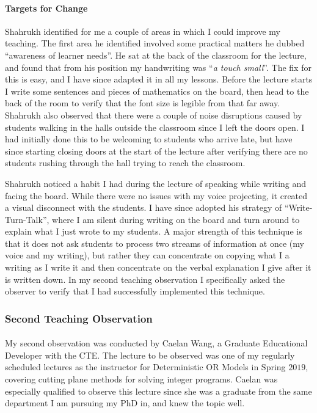 \documentclass{article}
\begin{document}
\paragraph{Targets for Change} Shahrukh identified for me a couple of areas in which I could improve my teaching. The first area he identified involved some practical matters he dubbed ``awareness of learner needs''. He sat at the back of the classroom for the lecture, and found that from his position my handwriting was ``\emph{a touch small}''. The fix for this is easy, and I have since adapted it in all my lessons. Before the lecture starts I write some sentences and pieces of mathematics on the board, then head to the back of the room to verify that the font size is legible from that far away. Shahrukh also observed that there were a couple of noise disruptions caused by students walking in the halls outside the classroom since I left the doors open. I had initially done this to be welcoming to students who arrive late, but have since starting closing doors at the start of the lecture after verifying there are no students rushing through the hall trying to reach the classroom.

Shahrukh noticed a habit I had during the lecture of speaking while writing and facing the board. While there were no issues with my voice projecting, it created a visual disconnect with the students. I have since adopted his strategy of ``Write-Turn-Talk'', where I am silent during writing on the board and turn around to explain what I just wrote to my students. A major strength of this technique is that it does not ask students to process two streams of information at once (my voice and my writing), but rather they can concentrate on copying what I a writing as I write it and then concentrate on the verbal explanation I give after it is written down. In my second teaching observation I specifically asked the observer to verify that I had successfully implemented this technique.

\subsubsection*{Second Teaching Observation}
\paragraph{}My second observation was conducted by Caelan Wang, a Graduate Educational Developer with the CTE. The lecture to be observed was one of my regularly scheduled lectures as the instructor for Deterministic OR Models in Spring $2019$, covering cutting plane methods for solving integer programs. Caelan was especially qualified to observe this lecture since she was a graduate from the same department I am pursuing my PhD in, and knew the topic well.
\end{document}
